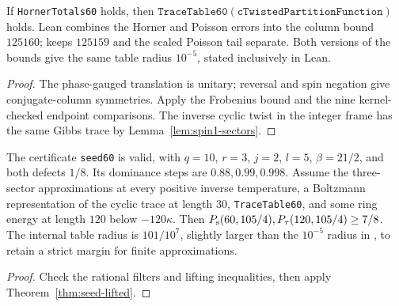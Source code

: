 \begin{theorem}
  \label{thm:spin1-table60}
  \leanok
  If \texttt{HornerTotals60} holds, then
  \(\texttt{TraceTable60}(\texttt{cTwistedPartitionFunction})\) holds.
  Lean combines the Horner and Poisson errors into the column bound \(125160\);
  \cite[Appendix A.2]{OpenAIHaldane} keeps \(125159\) and the scaled Poisson tail separate.
  Both versions of the bounds give the same table radius \(10^{-5}\), stated inclusively in Lean.
\end{theorem}
\begin{proof}
  \leanok
  The phase-gauged translation is unitary; reversal and spin negation give conjugate-column
  symmetries. Apply the Frobenius bound and the nine kernel-checked endpoint comparisons.
  The inverse cyclic twist in the integer frame has the same Gibbs trace by
  Lemma~\ref{lem:spin1-sectors}.
\end{proof}

\begin{lemma}
  \label{lem:spin1-certificate60}
  \leanok
  The certificate \texttt{seed60} is valid, with \(q=10\), \(r=3\), \(j=2\), \(l=5\),
  \(\beta=21/2\), and both defects \(1/8\).
  Its dominance steps are \(0.88,0.99,0.998\).
  Assume the three-sector approximations at every positive inverse temperature, a Boltzmann
  representation of the cyclic trace at length \(30\), \texttt{TraceTable60}, and some
  ring energy at length \(120\) below \(-120\kappa\).
  Then \(P_{\mathrm{s}}(60,105/4),P_{\tau}(120,105/4)\ge7/8\).
  The internal table radius is \(101/10^7\), slightly larger than the \(10^{-5}\) radius in
  \cite[Section 5.2]{OpenAIHaldane}, to retain a strict margin for finite approximations.
\end{lemma}
\begin{proof}
  \leanok
  Check the rational filters and lifting inequalities, then apply
  Theorem~\ref{thm:seed-lifted}.
\end{proof}

